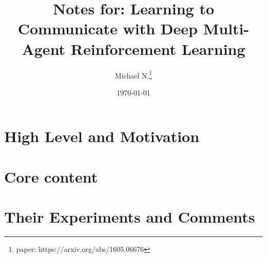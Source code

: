 \documentclass{article}
\title{Notes for: Learning to Communicate with Deep Multi-Agent Reinforcement Learning}
\author{Michael N.\thanks{paper: https://arxiv.org/abs/1605.06676}}
\date{\today}
\begin{document}
    \maketitle
    \section{High Level and Motivation}
    \section{Core content}
    \section{Their Experiments and Comments}
\end{document}
